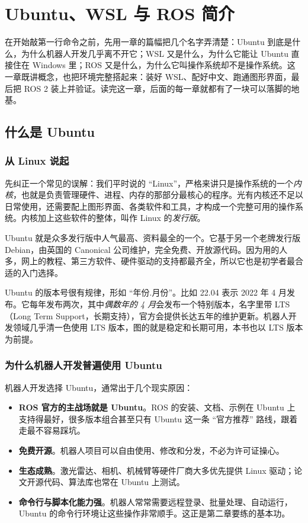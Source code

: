 \documentclass[12pt,a4paper]{ctexbook}
\begin{document}
\fi

\chapter{Ubuntu、WSL 与 ROS 简介}

在开始敲第一行命令之前，先用一章的篇幅把几个名字弄清楚：Ubuntu 到底是什么，为什么机器人开发几乎离不开它；WSL 又是什么，为什么它能让 Ubuntu 直接住在 Windows 里；ROS 又是什么，为什么它叫操作系统却不是操作系统。这一章既讲概念，也把环境完整搭起来：装好 WSL、配好中文、跑通图形界面，最后把 ROS 2 装上并验证。读完这一章，后面的每一章就都有了一块可以落脚的地基。

\section{什么是 Ubuntu}

\subsection{从 Linux 说起}

先纠正一个常见的误解：我们平时说的 ``Linux''，严格来讲只是操作系统的一个\emph{内核}，也就是负责管理硬件、进程、内存的那部分最核心的程序。光有内核还不足以日常使用，还需要配上图形界面、各类软件和工具，才构成一个完整可用的操作系统。内核加上这些软件的整体，叫作 Linux 的\emph{发行版}。

Ubuntu 就是众多发行版中人气最高、资料最全的一个。它基于另一个老牌发行版 Debian，由英国的 Canonical 公司维护，完全免费、开放源代码。因为用的人多，网上的教程、第三方软件、硬件驱动的支持都最齐全，所以它也是初学者最合适的入门选择。

Ubuntu 的版本号很有规律，形如 ``年份.月份''。比如 22.04 表示 2022 年 4 月发布。它每年发布两次，其中\emph{偶数年的 4 月}会发布一个特别版本，名字里带 LTS（Long Term Support，长期支持），官方会提供长达五年的维护更新。机器人开发领域几乎清一色使用 LTS 版本，图的就是稳定和长期可用，本书也以 LTS 版本为前提。

\subsection{为什么机器人开发普遍使用 Ubuntu}

机器人开发选择 Ubuntu，通常出于几个现实原因：

\begin{itemize}
    \item \textbf{ROS 官方的主战场就是 Ubuntu}。ROS 的安装、文档、示例在 Ubuntu 上支持得最好，很多版本组合甚至只有 Ubuntu 这一条 ``官方推荐'' 路线，跟着走最不容易踩坑。
    \item \textbf{免费开源}。机器人项目可以自由使用、修改和分发，不必为许可证操心。
    \item \textbf{生态成熟}。激光雷达、相机、机械臂等硬件厂商大多优先提供 Linux 驱动；论文开源代码、算法库也常在 Ubuntu 上测试。
    \item \textbf{命令行与脚本化能力强}。机器人常常需要远程登录、批量处理、自动运行，Ubuntu 的命令行环境让这些操作非常顺手。这正是第二章要练的基本功。
\end{itemize}
\end{document}
